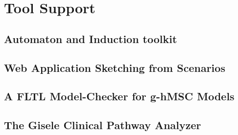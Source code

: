\chapter{Tool Support}

\section{Automaton and Induction toolkit}

\section{Web Application Sketching from Scenarios}

\section{A FLTL Model-Checker for g-hMSC Models}

\section{The Gisele Clinical Pathway Analyzer}
